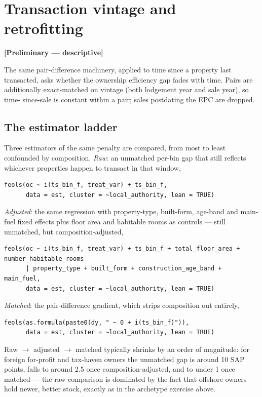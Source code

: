 \documentclass[11pt]{article}
\newcommand{\status}[1]{\textcolor{dlnavy}{\textbf{[#1]}}}
\begin{document}
\section{Transaction vintage and retrofitting}
\status{Preliminary --- descriptive}

The same pair-difference machinery, applied to time since a property last
transacted, asks whether the ownership efficiency gap fades with time. Pairs are
additionally exact-matched on vintage (both lodgement year and sale year), so time-
since-sale is constant within a pair; sales postdating the EPC are dropped.

\subsection{The estimator ladder}
Three estimators of the same penalty are compared, from most to least confounded by
composition. \emph{Raw}: an unmatched per-bin gap that still reflects whichever
properties happen to transact in that window,
\begin{lstlisting}
feols(oc ~ i(ts_bin_f, treat_var) + ts_bin_f,
      data = est, cluster = ~local_authority, lean = TRUE)
\end{lstlisting}
\emph{Adjusted}: the same regression with property-type, built-form, age-band and
main-fuel fixed effects plus floor area and habitable rooms as controls --- still
unmatched, but composition-adjusted,
\begin{lstlisting}
feols(oc ~ i(ts_bin_f, treat_var) + ts_bin_f + total_floor_area + number_habitable_rooms
      | property_type + built_form + construction_age_band + main_fuel,
      data = est, cluster = ~local_authority, lean = TRUE)
\end{lstlisting}
\emph{Matched}: the pair-difference gradient, which strips composition out entirely,
\begin{lstlisting}
feols(as.formula(paste0(dy, " ~ 0 + i(ts_bin_f)")),
      data = est, cluster = ~local_authority, lean = TRUE)
\end{lstlisting}
Raw $\to$ adjusted $\to$ matched typically shrinks by an order of magnitude: for
foreign for-profit and tax-haven owners the unmatched gap is around 10 SAP points,
falls to around 2.5 once composition-adjusted, and to under 1 once matched --- the
raw comparison is dominated by the fact that offshore owners hold newer, better
stock, exactly as in the archetype exercise above.
\end{document}
